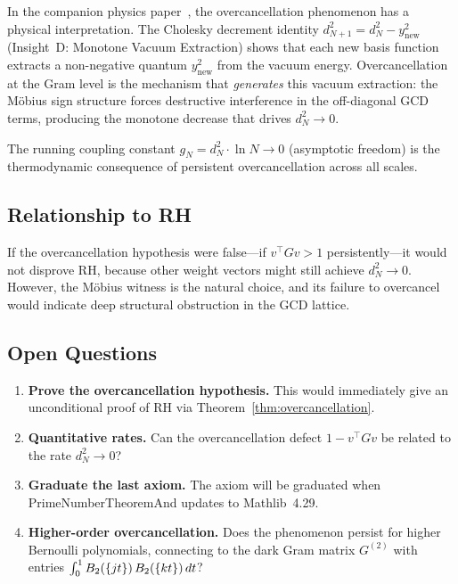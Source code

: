 \documentclass[11pt,a4paper]{article}
\begin{document}
In the companion physics paper~\cite{cathedral-physics}, the
overcancellation phenomenon has a physical interpretation.
The Cholesky decrement identity
$d^2_{N+1} = d^2_N - y^2_{\text{new}}$ (Insight~D: Monotone
Vacuum Extraction) shows that each new basis function extracts
a non-negative quantum $y^2_{\text{new}}$ from the vacuum energy.
Overcancellation at the Gram level is the mechanism that
\emph{generates} this vacuum extraction: the M\"obius sign
structure forces destructive interference in the off-diagonal
GCD terms, producing the monotone decrease that drives
$d^2_N \to 0$.

The running coupling constant $g_N = d^2_N \cdot \ln N \to 0$
(asymptotic freedom) is the thermodynamic consequence of
persistent overcancellation across all scales.

\subsection{Relationship to RH}

If the overcancellation hypothesis were false---if
$v^\top G v > 1$ persistently---it would not disprove RH,
because other weight vectors might still achieve $d_N^2 \to 0$.
However, the M\"obius witness is the natural choice, and its
failure to overcancel would indicate deep structural obstruction
in the GCD lattice.

\subsection{Open Questions}

\begin{enumerate}
  \item \textbf{Prove the overcancellation hypothesis.} This would
    immediately give an unconditional proof of RH via
    Theorem~\ref{thm:overcancellation}.
  \item \textbf{Quantitative rates.} Can the overcancellation
    defect $1 - v^\top G v$ be related to the rate $d_N^2 \to 0$?
  \item \textbf{Graduate the last axiom.} The axiom
     will be graduated when
    PrimeNumberTheoremAnd updates to Mathlib~4.29.
  \item \textbf{Higher-order overcancellation.} Does the phenomenon
    persist for higher Bernoulli polynomials, connecting to the dark
    Gram matrix $G^{(2)}$ with entries
    $\int_0^1 B_2(\{jt\})\,B_2(\{kt\})\,dt$?
\end{enumerate}
\end{document}
